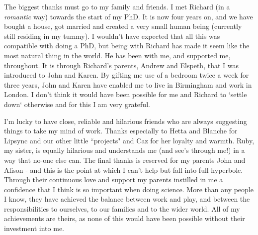 The biggest thanks must go to my family and friends. I met Richard (in a \textit{romantic} way) towards the start of my PhD. It is now four years on, and we have bought a house, got married and created a very small human being (currently still residing in my tummy). I wouldn't have expected that all this was compatible with doing a PhD, but being with Richard has made it seem like the most natural thing in the world. He has been with me, and supported me, throughout. It is through Richard's parents, Andrew and Elspeth, that I was introduced to John and Karen. By gifting me use of a bedroom twice a week for three years, John and Karen have enabled me to live in Birmingham and work in London. I don't think it would have been possible for me and Richard to `settle down` otherwise and for this I am very grateful.

I'm lucky to have close, reliable and hilarious friends who are always suggesting things to take my mind of work. Thanks especially to Hetta and Blanche for Lipsync and our other little ``projects" and Caz for her loyalty and warmth. Ruby, my sister, is equally hilarious and understands me (and see's through me!) in a way that no-one else can. The final thanks is reserved for my parents John and Alison - and this is the point at which I can't help but fall into full hyperbole. Through their continuous love and support my parents instilled in me a confidence that I think is so important when doing science. More than any people I know, they have achieved the balance between work and play, and between the responsibilities to ourselves, to our families and to the wider world. All of my achievements are theirs, as none of this would have been possible without their investment into me.
